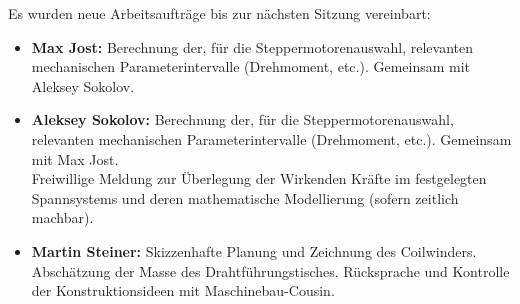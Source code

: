 
Es wurden neue Arbeitsaufträge bis zur nächsten Sitzung vereinbart:

\begin{itemize}
    \item \textbf{Max Jost:} Berechnung der, für die Steppermotorenauswahl, relevanten mechanischen Parameterintervalle (Drehmoment, etc.). Gemeinsam mit Aleksey Sokolov.
    \item \textbf{Aleksey Sokolov:} Berechnung der, für die Steppermotorenauswahl, relevanten mechanischen Parameterintervalle (Drehmoment, etc.). Gemeinsam mit Max Jost.\\
    Freiwillige Meldung zur Überlegung der Wirkenden Kräfte im festgelegten Spannsystems und deren mathematische Modellierung (sofern zeitlich machbar).
    \item \textbf{Martin Steiner:} Skizzenhafte Planung und Zeichnung des Coilwinders. Abschätzung der Masse des Drahtführungstisches. Rücksprache und Kontrolle der Konstruktionsideen mit Maschinebau-Cousin.
\end{itemize}

\newpage